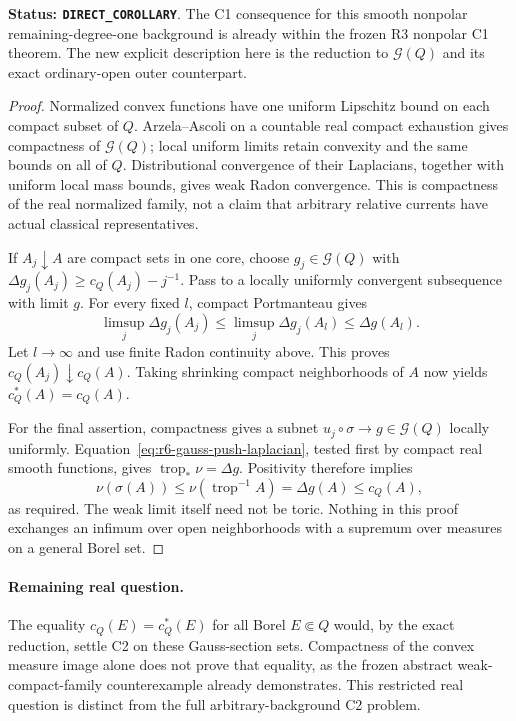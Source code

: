 \documentclass[11pt,a4paper]{article}
\numberwithin{equation}{section}
\theoremstyle{definition}
\theoremstyle{remark}
\begin{document}
\noindent\textbf{Status: \texttt{DIRECT\_COROLLARY}}. The C1
consequence for this smooth nonpolar remaining-degree-one background
is already within the frozen R3 nonpolar C1 theorem. The new explicit
description here is the reduction to $\mathcal G(Q)$ and its exact
ordinary-open outer counterpart.

\begin{proof}
Normalized convex functions have one uniform Lipschitz bound on
each compact subset of $Q$. Arzela--Ascoli on a countable real compact
exhaustion gives compactness of $\mathcal G(Q)$; local uniform limits
retain convexity and the same bounds on all of $Q$. Distributional
convergence of their Laplacians, together with uniform local mass
bounds, gives weak Radon convergence. This is compactness of the
real normalized family, not a claim that arbitrary relative currents
have actual classical representatives.

If $A_j\downarrow A$ are compact sets in one core, choose
$g_j\in\mathcal G(Q)$ with
$\Delta g_j(A_j)\ge c_Q(A_j)-j^{-1}$. Pass to a locally uniformly
convergent subsequence with limit $g$. For every fixed $l$, compact
Portmanteau gives
\[
 \limsup_j\Delta g_j(A_j)
      \le\limsup_j\Delta g_j(A_l)\le\Delta g(A_l).
\]
Let $l\to\infty$ and use finite Radon continuity above. This proves
$c_Q(A_j)\downarrow c_Q(A)$. Taking shrinking compact neighborhoods
of $A$ now yields $c_Q^*(A)=c_Q(A)$.

For the final assertion, compactness gives a subnet
$u_j\circ\sigma\to g\in\mathcal G(Q)$ locally uniformly.
Equation~\eqref{eq:r6-gauss-push-laplacian}, tested first by compact
real smooth functions, gives $\operatorname{trop}_*\nu=\Delta g$.
Positivity therefore implies
\[
 \nu(\sigma(A))\le\nu(\operatorname{trop}^{-1}A)
      =\Delta g(A)\le c_Q(A),
\]
as required. The weak limit itself need not be toric. Nothing in this
proof exchanges an infimum over open neighborhoods with a supremum
over measures on a general Borel set.
\end{proof}

\paragraph{Remaining real question.}
The equality $c_Q(E)=c_Q^*(E)$ for all Borel $E\Subset Q$ would,
by the exact reduction, settle C2 on these Gauss-section sets.
Compactness of the convex measure image alone does not prove that
equality, as the frozen abstract weak-compact-family counterexample
already demonstrates. This restricted real question is distinct from
the full arbitrary-background C2 problem.
\end{document}
